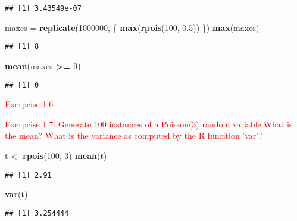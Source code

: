 \documentclass[]{article}
\newenvironment{Shaded}{\begin{snugshade}}{\end{snugshade}}
\newcommand{\KeywordTok}[1]{\textcolor[rgb]{0.13,0.29,0.53}{\textbf{#1}}}
\newcommand{\DecValTok}[1]{\textcolor[rgb]{0.00,0.00,0.81}{#1}}
\newcommand{\FloatTok}[1]{\textcolor[rgb]{0.00,0.00,0.81}{#1}}
\newcommand{\StringTok}[1]{\textcolor[rgb]{0.31,0.60,0.02}{#1}}
\newcommand{\OperatorTok}[1]{\textcolor[rgb]{0.81,0.36,0.00}{\textbf{#1}}}
\newcommand{\NormalTok}[1]{#1}
\begin{document}
\begin{verbatim}
## [1] 3.43549e-07
\end{verbatim}

\begin{Shaded}
\begin{Highlighting}[]
\NormalTok{maxes =}\StringTok{ }\KeywordTok{replicate}\NormalTok{(}\DecValTok{1000000}\NormalTok{, \{}
  \KeywordTok{max}\NormalTok{(}\KeywordTok{rpois}\NormalTok{(}\DecValTok{100}\NormalTok{, }\FloatTok{0.5}\NormalTok{))}
\NormalTok{\})}
\KeywordTok{max}\NormalTok{(maxes)}
\end{Highlighting}
\end{Shaded}

\begin{verbatim}
## [1] 8
\end{verbatim}

\begin{Shaded}
\begin{Highlighting}[]
\KeywordTok{mean}\NormalTok{(maxes }\OperatorTok{>=}\StringTok{ }\DecValTok{9}\NormalTok{)}
\end{Highlighting}
\end{Shaded}

\begin{verbatim}
## [1] 0
\end{verbatim}

\textcolor{red}{Exerpcise 1.6}

\textcolor{red}{Exerpcise 1.7: Generate 100 instances of a Poisson(3) random variable.What is the mean? What is the variance as computed by the R funcition 'var'?}

\begin{Shaded}
\begin{Highlighting}[]
\NormalTok{t <-}\StringTok{ }\KeywordTok{rpois}\NormalTok{(}\DecValTok{100}\NormalTok{, }\DecValTok{3}\NormalTok{)}
\KeywordTok{mean}\NormalTok{(t)}
\end{Highlighting}
\end{Shaded}

\begin{verbatim}
## [1] 2.91
\end{verbatim}

\begin{Shaded}
\begin{Highlighting}[]
\KeywordTok{var}\NormalTok{(t)}
\end{Highlighting}
\end{Shaded}

\begin{verbatim}
## [1] 3.254444
\end{verbatim}
\end{document}

